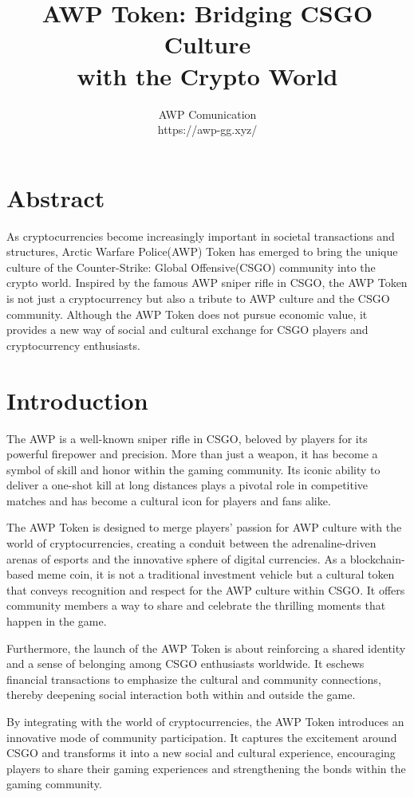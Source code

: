 \documentclass[journal,onecolumn,]{IEEEtran}
\title{AWP Token: Bridging CSGO Culture \\ with the Crypto World}
\author{AWP Comunication \\ https://awp-gg.xyz/}
\date{}
\begin{document}
	
	\maketitle
	
	\section*{Abstract}
	As cryptocurrencies become increasingly important in societal transactions and structures, Arctic Warfare Police(AWP) Token has emerged to bring the unique culture of the Counter-Strike: Global Offensive(CSGO) community into the crypto world. Inspired by the famous AWP sniper rifle in CSGO, the AWP Token is not just a cryptocurrency but also a tribute to AWP culture and the CSGO community. Although the AWP Token does not pursue economic value, it provides a new way of social and cultural exchange for CSGO players and cryptocurrency enthusiasts. 
	
	\section{Introduction}
	
	The AWP is a well-known sniper rifle in CSGO\cite{CSGOBombCode}, beloved by players for its powerful firepower and precision. More than just a weapon, it has become a symbol of skill and honor within the gaming community. Its iconic ability to deliver a one-shot kill at long distances plays a pivotal role in competitive matches and has become a cultural icon for players and fans alike.
	
	The AWP Token is designed to merge players' passion for AWP culture\cite{PixelsUnderstandingSignificance} with the world of cryptocurrencies, creating a conduit between the adrenaline-driven arenas of esports and the innovative sphere of digital currencies. As a blockchain-based meme coin, it is not a traditional investment vehicle but a cultural token that conveys recognition and respect for the AWP culture within CSGO. It offers community members a way to share and celebrate the thrilling moments that happen in the game.
	
	Furthermore, the launch of the AWP Token is about reinforcing a shared identity and a sense of belonging among CSGO enthusiasts worldwide. It eschews financial transactions to emphasize the cultural and community connections, thereby deepening social interaction both within and outside the game.
	
	By integrating with the world of cryptocurrencies, the AWP Token introduces an innovative mode of community participation\cite{nakamotoBitcoinPeertoPeerElectronic}. It captures the excitement around CSGO and transforms it into a new social and cultural experience, encouraging players to share their gaming experiences and strengthening the bonds within the gaming community.
	
\end{document}
